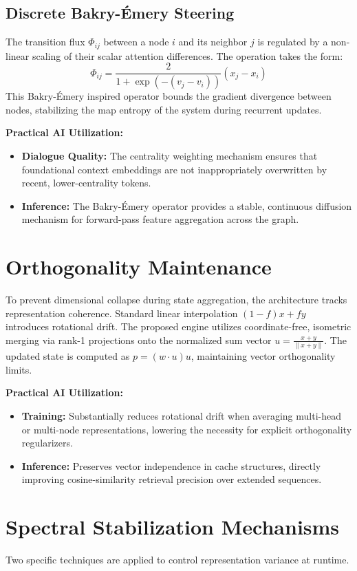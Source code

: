 \documentclass[11pt,a4paper]{article}
\begin{document}
\subsection{Discrete Bakry-\'Emery Steering}
The transition flux $\Phi_{ij}$ between a node $i$ and its neighbor $j$ is regulated by a non-linear scaling of their scalar attention differences. The operation takes the form:
\[
\Phi_{ij} = \frac{2}{1 + \exp(-(v_j - v_i))} (x_j - x_i)
\]
This Bakry-\'Emery inspired operator bounds the gradient divergence between nodes, stabilizing the map entropy of the system during recurrent updates.

\textbf{Practical AI Utilization:}
\begin{itemize}
    \item \textbf{Dialogue Quality:} The centrality weighting mechanism ensures that foundational context embeddings are not inappropriately overwritten by recent, lower-centrality tokens.
    \item \textbf{Inference:} The Bakry-\'Emery operator provides a stable, continuous diffusion mechanism for forward-pass feature aggregation across the graph.
\end{itemize}

\section{Orthogonality Maintenance}
To prevent dimensional collapse during state aggregation, the architecture tracks representation coherence. Standard linear interpolation $(1-f)x + fy$ introduces rotational drift. The proposed engine utilizes coordinate-free, isometric merging via rank-1 projections onto the normalized sum vector $u = \frac{x+y}{\|x+y\|}$. The updated state is computed as $p = (w \cdot u) u$, maintaining vector orthogonality limits.

\textbf{Practical AI Utilization:}
\begin{itemize}
    \item \textbf{Training:} Substantially reduces rotational drift when averaging multi-head or multi-node representations, lowering the necessity for explicit orthogonality regularizers.
    \item \textbf{Inference:} Preserves vector independence in cache structures, directly improving cosine-similarity retrieval precision over extended sequences.
\end{itemize}

\section{Spectral Stabilization Mechanisms}
Two specific techniques are applied to control representation variance at runtime.
\end{document}
